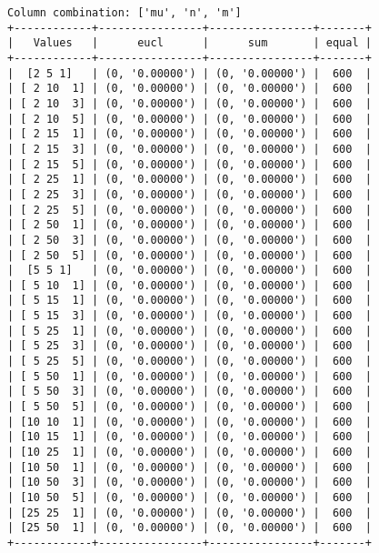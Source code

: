 \documentclass{article}
\begin{document}
\begin{verbatim}
Column combination: ['mu', 'n', 'm']
+------------+----------------+----------------+-------+
|   Values   |      eucl      |      sum       | equal |
+------------+----------------+----------------+-------+
|  [2 5 1]   | (0, '0.00000') | (0, '0.00000') |  600  |
| [ 2 10  1] | (0, '0.00000') | (0, '0.00000') |  600  |
| [ 2 10  3] | (0, '0.00000') | (0, '0.00000') |  600  |
| [ 2 10  5] | (0, '0.00000') | (0, '0.00000') |  600  |
| [ 2 15  1] | (0, '0.00000') | (0, '0.00000') |  600  |
| [ 2 15  3] | (0, '0.00000') | (0, '0.00000') |  600  |
| [ 2 15  5] | (0, '0.00000') | (0, '0.00000') |  600  |
| [ 2 25  1] | (0, '0.00000') | (0, '0.00000') |  600  |
| [ 2 25  3] | (0, '0.00000') | (0, '0.00000') |  600  |
| [ 2 25  5] | (0, '0.00000') | (0, '0.00000') |  600  |
| [ 2 50  1] | (0, '0.00000') | (0, '0.00000') |  600  |
| [ 2 50  3] | (0, '0.00000') | (0, '0.00000') |  600  |
| [ 2 50  5] | (0, '0.00000') | (0, '0.00000') |  600  |
|  [5 5 1]   | (0, '0.00000') | (0, '0.00000') |  600  |
| [ 5 10  1] | (0, '0.00000') | (0, '0.00000') |  600  |
| [ 5 15  1] | (0, '0.00000') | (0, '0.00000') |  600  |
| [ 5 15  3] | (0, '0.00000') | (0, '0.00000') |  600  |
| [ 5 25  1] | (0, '0.00000') | (0, '0.00000') |  600  |
| [ 5 25  3] | (0, '0.00000') | (0, '0.00000') |  600  |
| [ 5 25  5] | (0, '0.00000') | (0, '0.00000') |  600  |
| [ 5 50  1] | (0, '0.00000') | (0, '0.00000') |  600  |
| [ 5 50  3] | (0, '0.00000') | (0, '0.00000') |  600  |
| [ 5 50  5] | (0, '0.00000') | (0, '0.00000') |  600  |
| [10 10  1] | (0, '0.00000') | (0, '0.00000') |  600  |
| [10 15  1] | (0, '0.00000') | (0, '0.00000') |  600  |
| [10 25  1] | (0, '0.00000') | (0, '0.00000') |  600  |
| [10 50  1] | (0, '0.00000') | (0, '0.00000') |  600  |
| [10 50  3] | (0, '0.00000') | (0, '0.00000') |  600  |
| [10 50  5] | (0, '0.00000') | (0, '0.00000') |  600  |
| [25 25  1] | (0, '0.00000') | (0, '0.00000') |  600  |
| [25 50  1] | (0, '0.00000') | (0, '0.00000') |  600  |
+------------+----------------+----------------+-------+
\end{verbatim}
\end{document}
